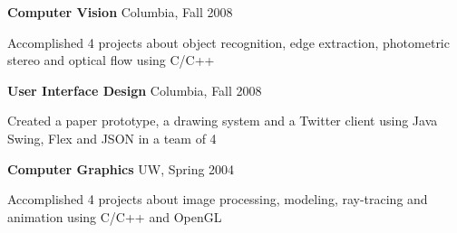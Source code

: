 \documentclass[margin,line]{resume}
\begin{document}
\begin{resume}
    \textbf{Computer Vision} \hfill Columbia, Fall 2008 \vspace{-3mm}\\\vspace{-1mm}%
      \begin{list2}
      \item Accomplished 4 projects about object recognition, edge extraction, photometric stereo and optical flow using C/C++       
      \end{list2}


    \textbf{User Interface Design} \hfill Columbia, Fall 2008  \vspace{-3mm}\\\vspace{-1mm}%
      \begin{list2}
      \item Created a paper prototype, a drawing system and a Twitter client using Java Swing, Flex and JSON in a team of 4 
      \end{list2}      

    \textbf{Computer Graphics} \hfill UW, Spring 2004  \vspace{-3mm}\\\vspace{-1mm}%
      \begin{list2}
      \item Accomplished 4 projects about image processing, modeling, ray-tracing and animation using C/C++ and OpenGL       
      \end{list2}

\end{resume}
\end{document}
